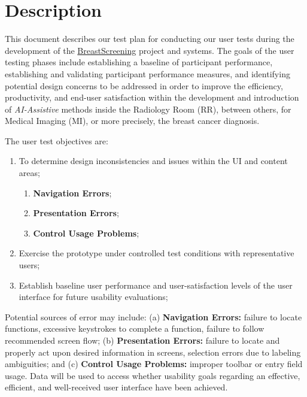 
\section{Description}
\label{sec:sec002}

This document describes our test plan for conducting our user tests during the development of the \hyperlink{https://breastscreening.github.io/}{BreastScreening} project and systems. The goals of the user testing phases include establishing a baseline of participant performance, establishing and validating participant performance measures, and identifying potential design concerns to be addressed in order to improve the efficiency, productivity, and end-user satisfaction within the development and introduction of \textit{AI-Assistive} methods inside the Radiology Room (RR), between others, for Medical Imaging (MI), or more precisely, the breast cancer diagnosis.


\hfill

The user test objectives are:

\begin{enumerate}
\item To determine design inconsistencies and issues within the UI and content areas;
\begin{enumerate}
\item \textbf{Navigation Errors};
\item \textbf{Presentation Errors};
\item \textbf{Control Usage Problems};
\end{enumerate}
\item Exercise the prototype under controlled test conditions with representative users;
\item Establish baseline user performance and user-satisfaction levels of the user interface for future usability evaluations;
\end{enumerate}


Potential sources of error may include: (a) \textbf{Navigation Errors:} failure to locate functions, excessive keystrokes to complete a function, failure to follow recommended screen flow; (b) \textbf{Presentation Errors:} failure to locate and properly act upon desired information in screens, selection errors due to labeling ambiguities; and (c) \textbf{Control Usage Problems:} improper toolbar or entry field usage. Data will be used to access whether usability goals regarding an effective, efficient, and well-received user interface have been achieved.

